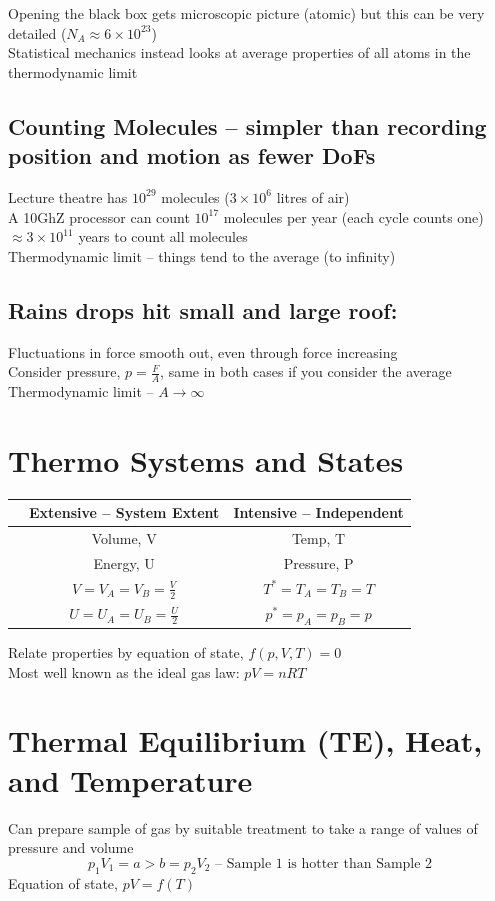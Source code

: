 \documentclass[a4paper, 11pt, normalem]{report}
\newcommand\answerbox{%
    \fbox{\rule{0.8in}{0pt}\rule[-0.5ex]{0pt}{3ex}}}
\newcommand\halfbox{%
    \fbox{\rule{0.36in}{0pt}\rule[-0.25ex]{0pt}{3ex}}}
\begin{document}
Opening the black box gets microscopic picture (atomic) but this can be very detailed ($N_A \approx 6 \times 10^23$) \\
Statistical mechanics instead looks at average properties of all atoms in the thermodynamic limit

\subsection{Counting Molecules -- simpler than recording position and motion  as fewer DoFs}
Lecture theatre has $10^29$ molecules ($3 \times 10^6$ litres of air) \\
A 10GhZ processor can count $10^17$ molecules per year (each cycle counts one) $\approx 3 \times 10^11$ years to count all molecules \\
Thermodynamic limit -- things tend to the average (to infinity)

\subsection{Rains drops hit small and large roof:}
Fluctuations in force smooth out, even through force increasing \\
Consider pressure, $p = \frac{F}{A}$, same in both cases if you consider the average \\
Thermodynamic limit -- $A \to \infty$

\section{Thermo Systems and States}
\begin{tabular}{c|c|c}
     & Extensive -- System Extent & Intensive -- Independent \\
     \hline
     \multirow{2}{7em}{\answerbox} & Volume, V & Temp, T \\
     & Energy, U & Pressure, P \\
     \hline
     \multirow{2}{7em}{\halfbox \halfbox} & $V = V_A = V_B = \frac{V}{2}$ & $T^* = T_A = T_B = T$ \\
     & $U = U_A = U_B = \frac{U}{2}$ & $p^* = p_A = p_B = p$
\end{tabular}

Relate properties by equation of state, $f(p,V,T) = 0$ \\
Most well known as the ideal gas law: $pV = nRT$

\section{Thermal Equilibrium (TE), Heat, and Temperature}
Can prepare sample of gas by suitable treatment to take a range of values of pressure and volume
\begin{equation*}
    p_{1}V_{1} = a > b = p_{2}V_{2} \text{ -- Sample 1 is hotter than Sample 2}
\end{equation*}
Equation of state, $pV = f(T)$
\end{document}
